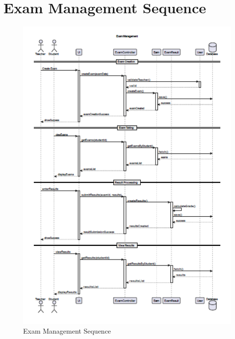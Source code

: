 \documentclass[12pt,a4paper]{report}
\begin{document}
\section{Exam Management Sequence}
\begin{figure}[htbp]
    \centering
    \includegraphics[width=1\textwidth]{exam-management-sequence.png}
    \caption{Exam Management Sequence}
    \label{fig:exam-management-sequence}
\end{figure}
\end{document}
